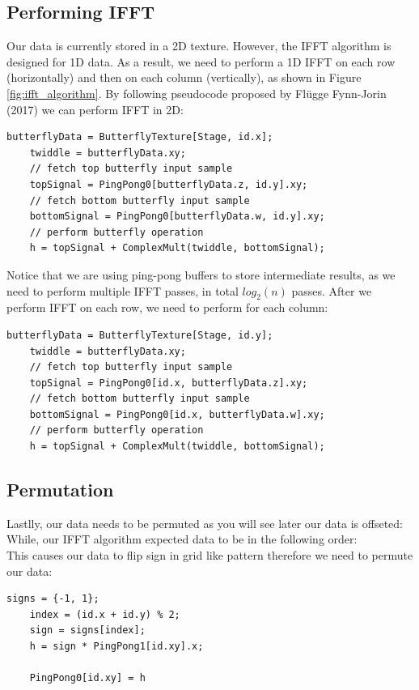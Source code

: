 \subsection{Performing IFFT}
Our data is currently stored in a 2D texture. However, the IFFT algorithm is designed for 1D data. As a result, we need to perform a 1D IFFT on each row (horizontally) and then on each column (vertically), as shown in Figure \ref{fig:ifft_algorithm}.
By following pseudocode proposed by Fl{\"u}gge Fynn-Jorin (2017) \cite{flugge2017} we can perform IFFT in 2D:

\begin{lstlisting}[caption={Horizontal Butterfly Operation}, frame=single, numberstyle=\small\color{gray}, captionpos=b]
    butterflyData = ButterflyTexture[Stage, id.x];
    twiddle = butterflyData.xy;
    // fetch top butterfly input sample
    topSignal = PingPong0[butterflyData.z, id.y].xy;
    // fetch bottom butterfly input sample
    bottomSignal = PingPong0[butterflyData.w, id.y].xy;
    // perform butterfly operation
    h = topSignal + ComplexMult(twiddle, bottomSignal);
\end{lstlisting}

Notice that we are using ping-pong buffers to store intermediate results, as we need to perform multiple IFFT passes, in total $log_2(n)$ passes.
After we perform IFFT on each row, we need to perform for each column:
\begin{lstlisting}[caption={Vertical Butterfly Operation}, frame=single, numberstyle=\small\color{gray}, captionpos=b]
    butterflyData = ButterflyTexture[Stage, id.y];
    twiddle = butterflyData.xy;
    // fetch top butterfly input sample
    topSignal = PingPong0[id.x, butterflyData.z].xy;
    // fetch bottom butterfly input sample
    bottomSignal = PingPong0[id.x, butterflyData.w].xy;
    // perform butterfly operation
    h = topSignal + ComplexMult(twiddle, bottomSignal);
\end{lstlisting}

\subsection*{Permutation}
Lastlly, our data needs to be permuted as you will see later our data is offseted:
\begin{equation}
    [\text{freq} (-N / 2), \text{ ...}, \text{ freq} (-1), \text{ freq} (0), \text{ freq} (1), \text{ ...}, \text{ freq} (N / 2 - 1)]
\end{equation}
While, our IFFT algorithm expected data to be in the following order:
\begin{equation}
    [\text{freq} (0), \text{ freq} (1), \text{ ...}, \text{ freq}(N - 1)]
\end{equation}
This causes our data to flip sign in grid like pattern therefore we need to permute our data:
\begin{lstlisting}[caption={Data Permutation \cite{flugge2017} }, frame=single, numberstyle=\small\color{gray}, captionpos=b]
    signs = {-1, 1};
    index = (id.x + id.y) % 2;
    sign = signs[index];
    h = sign * PingPong1[id.xy].x;
    
    PingPong0[id.xy] = h
\end{lstlisting}

